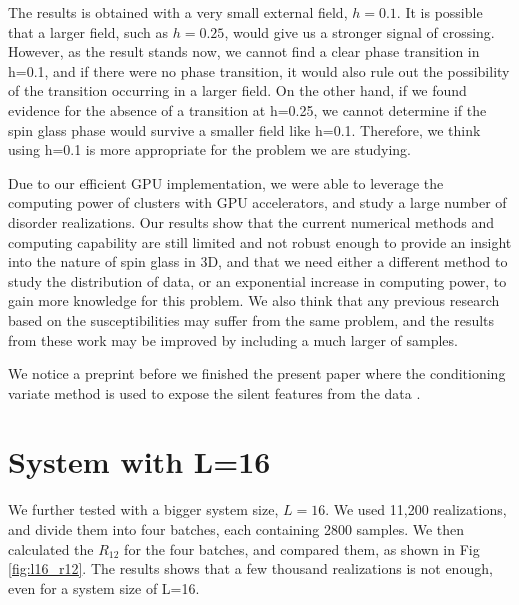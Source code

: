 \documentclass[aps,prb,twocolumn,showpacs,superscriptaddress]{revtex4}
\begin{document}
The results is obtained with a very small external field, $h=0.1$. It is possible
that a larger field, such as $h=0.25$, would give us a stronger signal of crossing.
However, as the result stands now, we cannot find a clear phase transition in 
h=0.1, and if there were no phase transition, it would also rule out the possibility 
of the transition occurring in a larger field. On the other hand, if we found evidence 
for the absence of a transition at h=0.25, we cannot determine if the spin glass 
phase would survive a smaller field like h=0.1. Therefore, we think using h=0.1 
is more appropriate for the problem we are studying.

Due to our efficient GPU implementation, we were able to leverage the computing
power of clusters with GPU accelerators, and study a large number of disorder
realizations.
Our results show that the current numerical methods and computing capability are 
still limited and not robust enough to provide an insight into the nature 
of spin glass in 3D, and that we need either a different method to study the 
distribution of data, or an exponential increase in computing power, to gain 
more knowledge for this problem. 
We also think that any previous research based on the susceptibilities may 
suffer from the same problem, and the results from these work may be improved
by including a much larger of samples.


We notice a preprint before
we finished the present paper where the conditioning variate method
is used to expose the silent features from the data \cite{Baity-Jesi-etal-2014}. 


\appendix
\section{System with L=16}

We further tested with a bigger system size, $L=16$. We used 11,200 realizations,
and divide them into four batches, each containing 2800 samples. We then calculated
the $R_{12}$ for the four batches, and compared them, as shown in Fig \ref{fig:l16_r12}. 
The results shows that a few thousand realizations is not enough, even for a 
system size of L=16. 
\end{document}
